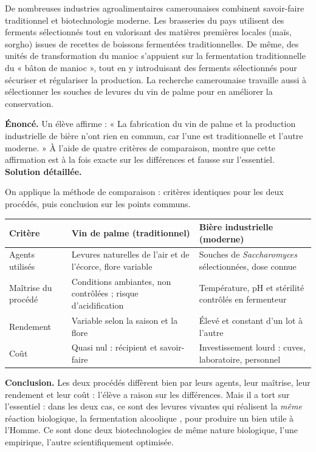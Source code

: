 \documentclass[11pt]{article}
\newcommand{\cle}[1]{{\popxbold\color{popdark}#1}}
\begin{document}
\begin{savaistu}
De nombreuses industries agroalimentaires camerounaises combinent savoir-faire traditionnel et biotechnologie moderne. Les brasseries du pays utilisent des ferments sélectionnés tout en valorisant des matières premières locales (maïs, sorgho) issues de recettes de boissons fermentées traditionnelles. De même, des unités de transformation du manioc s'appuient sur la fermentation traditionnelle du « bâton de manioc », tout en y introduisant des ferments sélectionnés pour sécuriser et régulariser la production. La recherche camerounaise travaille aussi à sélectionner les souches de levures du vin de palme pour en améliorer la conservation.
\end{savaistu}

\begin{exoresolu}
\textbf{Énoncé.} Un élève affirme : « La fabrication du vin de palme et la production industrielle de bière n'ont rien en commun, car l'une est traditionnelle et l'autre moderne. » À l'aide de quatre critères de comparaison, montre que cette affirmation est à la fois exacte sur les différences et fausse sur l'essentiel.
\tcblower
\textbf{Solution détaillée.}

On applique la méthode de comparaison : critères identiques pour les deux procédés, puis conclusion sur les points communs.

\begin{center}
\begin{tabularx}{\linewidth}{|l|X|X|}
\hline
\rowcolor{popblueL} \textbf{Critère} & \textbf{Vin de palme (traditionnel)} & \textbf{Bière industrielle (moderne)} \\
\hline
Agents utilisés & Levures naturelles de l'air et de l'écorce, flore variable & Souches de \emph{Saccharomyces} sélectionnées, dose connue \\
\hline
Maîtrise du procédé & Conditions ambiantes, non contrôlées ; risque d'acidification & Température, pH et stérilité contrôlés en fermenteur \\
\hline
Rendement & Variable selon la saison et la flore & Élevé et constant d'un lot à l'autre \\
\hline
Coût & Quasi nul : récipient et savoir-faire & Investissement lourd : cuves, laboratoire, personnel \\
\hline
\end{tabularx}
\end{center}

\textbf{Conclusion.} Les deux procédés diffèrent bien par leurs agents, leur maîtrise, leur rendement et leur coût : l'élève a raison sur les différences. Mais il a tort sur l'essentiel : dans les deux cas, ce sont des \cle{levures vivantes} qui réalisent la \emph{même} réaction biologique, la fermentation alcoolique , pour produire un bien utile à l'Homme. Ce sont donc deux biotechnologies de même nature biologique, l'une empirique, l'autre scientifiquement optimisée.
\end{exoresolu}
\end{document}
